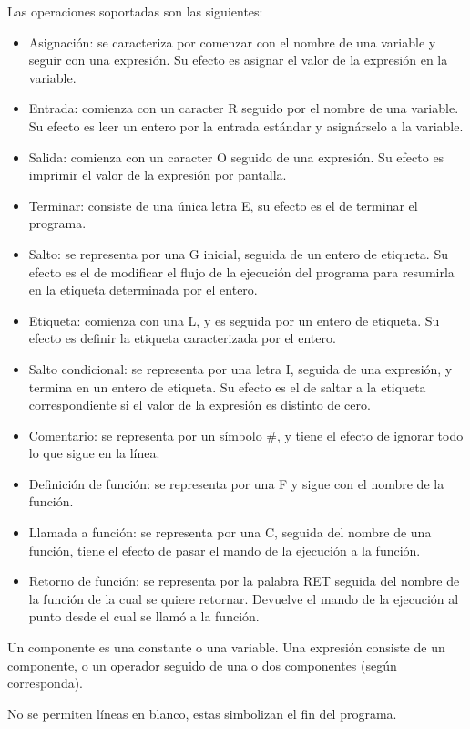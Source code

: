 \documentclass[12pt,spanish]{article}
\begin{document}
\noindent Las operaciones soportadas son las siguientes:
\begin{itemize}
\item{Asignación: se caracteriza por comenzar con el nombre de una variable y seguir con una expresión. Su efecto es asignar el valor de la expresión en la variable.}
\item{Entrada: comienza con un caracter R seguido por el nombre de una variable. Su efecto es leer un entero por la entrada estándar y asignárselo a la variable.}
\item{Salida: comienza con un caracter O seguido de una expresión. Su efecto es imprimir el valor de la expresión por pantalla.}
\item{Terminar: consiste de una única letra E, su efecto es el de terminar el programa.}
\item{Salto: se representa por una G inicial, seguida de un entero de etiqueta. Su efecto es el de modificar el flujo de la ejecución del programa para resumirla en la etiqueta determinada por el entero.}
\item{Etiqueta: comienza con una L, y es seguida por un entero de etiqueta. Su efecto es definir la etiqueta caracterizada por el entero.}
\item{Salto condicional: se representa por una letra I, seguida de una expresión, y termina en un entero de etiqueta. Su efecto es el de saltar a la etiqueta correspondiente si el valor de la expresión es distinto de cero.}
\item{Comentario: se representa por un símbolo \#, y tiene el efecto de ignorar todo lo que sigue en la línea.}
\item{Definición de función: se representa por una F y sigue con el nombre de la función.}
\item{Llamada a función: se representa por una C, seguida del nombre de una función, tiene el efecto de pasar el mando de la ejecución a la función.}
\item{Retorno de función: se representa por la palabra RET seguida del nombre de la función de la cual se quiere retornar. Devuelve el mando de la ejecución al punto desde el cual se llamó a la función.}
\end{itemize}

\noindent Un componente es una constante o una variable. Una expresión consiste de un componente, o un operador seguido de una o dos componentes (según corresponda).

\noindent No se permiten líneas en blanco, estas simbolizan el fin del programa.
\end{document}
